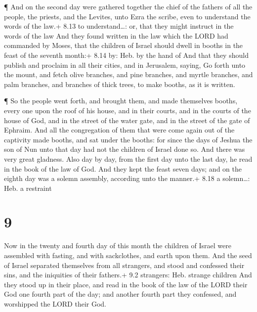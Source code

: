  ¶ And on the second day were gathered together the chief
of the fathers of all the people, the priests, and the Levites, unto
Ezra the scribe, even to understand the words of the law.+ 8.13 to
understand\ldots: or, that they might instruct in the words of the law
 And they found written in the law which the LORD had
commanded by Moses, that the children of Israel should dwell in booths
in the feast of the seventh month:+ 8.14 by: Heb. by the hand of
 And that they should publish and proclaim in all their
cities, and in Jerusalem, saying, Go forth unto the mount, and fetch
olive branches, and pine branches, and myrtle branches, and palm
branches, and branches of thick trees, to make booths, as it is written.

 ¶ So the people went forth, and brought them, and made
themselves booths, every one upon the roof of his house, and in their
courts, and in the courts of the house of God, and in the street of the
water gate, and in the street of the gate of Ephraim.  And
all the congregation of them that were come again out of the captivity
made booths, and sat under the booths: for since the days of Jeshua the
son of Nun unto that day had not the children of Israel done so. And
there was very great gladness.  Also day by day, from the
first day unto the last day, he read in the book of the law of God. And
they kept the feast seven days; and on the eighth day was a solemn
assembly, according unto the manner.+ 8.18 a solemn\ldots: Heb. a
restraint

\hypertarget{section-8}{%
\section{9}\label{section-8}}

 Now in the twenty and fourth day of this month the children
of Israel were assembled with fasting, and with sackclothes, and earth
upon them.  And the seed of Israel separated themselves from
all strangers, and stood and confessed their sins, and the iniquities of
their fathers.+ 9.2 strangers: Heb. strange children  And
they stood up in their place, and read in the book of the law of the
LORD their God one fourth part of the day; and another fourth part they
confessed, and worshipped the LORD their God.

